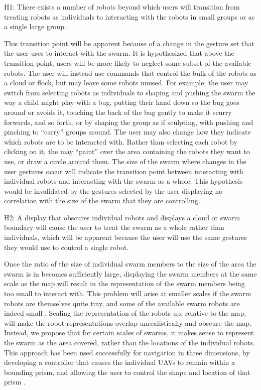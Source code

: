 H1: There exists a number of robots beyond which users will transition from treating robots as individuals to interacting with the robots in small groups or as a single large group. 

This transition point will be apparent because of a change in the gesture set that the user uses to interact with the swarm. 
It is hypothesized that above the transition point, users will be more likely to neglect some subset of the available robots. 
The user will instead use commands that control the bulk of the robots as a cloud or flock, but may leave some robots unused. 
For example, the user may switch from selecting robots as individuals to shaping and pushing the swarm the way a child might play with a bug, putting their hand down so the bug goes around or avoids it, touching the back of the bug gently to make it scurry forwards, and so forth, or by shaping the group as if sculpting, with pushing and pinching to ``carry'' groups around. 
The user may also change how they indicate which robots are to be interacted with. 
Rather than selecting each robot by clicking on it, the may ``paint'' over the area containing the robots they want to use, or draw a circle around them. 
The size of the swarm where changes in the user gestures occur will indicate the transition point between interacting with individual robots and interacting with the swarm as a whole. 
This hypothesis would be invalidated by the gestures selected by the user displaying no correlation with the size of the swarm that they are controlling. 

H2: A display that obscures individual robots and displays a cloud or swarm boundary will cause the user to treat the swarm as a whole rather than individuals, which will be apparent because the user will use the same gestures they would use to control a single robot. 

Once the ratio of the size of individual swarm members to the size of the area the swarm is in becomes sufficiently large, displaying the swarm members at the same scale as the map will result in the representation of the swarm members being too small to interact with. 
This problem will arise at smaller scales if the swarm robots are themselves quite tiny, and some of the available swarm robots are indeed small \citep{pelrine2012diamagnetically}.
Scaling the representation of the robots up, relative to the map, will make the robot representations overlap unrealistically and obscure the map. 
Instead, we propose that for certain scales of swarms, it makes sense to represent the swarm as the area covered, rather than the locations of the individual robots.
This approach has been used successfully for navigation in three dimensions, by developing a controller that causes the individual UAVs to remain within a bounding prism, and allowing the user to control the shape and location of that prism \citep{ayanian2014controlling}.

